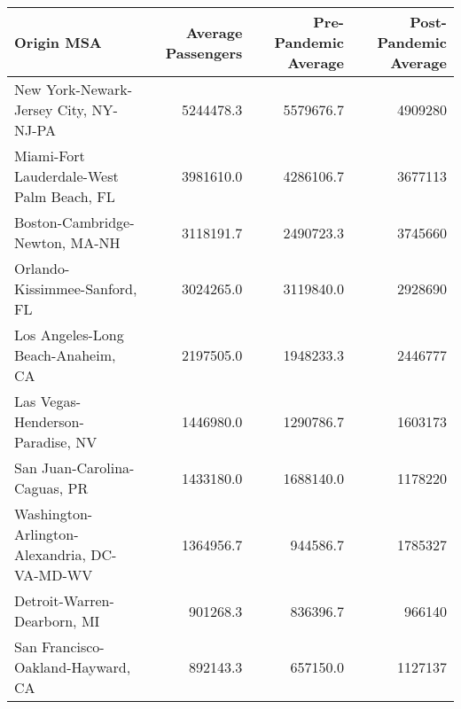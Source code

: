 
\begin{tabular}{lrrr}
\toprule
Origin MSA & Average Passengers & Pre-Pandemic Average & Post-Pandemic Average\\
\midrule
New York-Newark-Jersey City, NY-NJ-PA & 5244478.3 & 5579676.7 & 4909280\\
Miami-Fort Lauderdale-West Palm Beach, FL & 3981610.0 & 4286106.7 & 3677113\\
Boston-Cambridge-Newton, MA-NH & 3118191.7 & 2490723.3 & 3745660\\
Orlando-Kissimmee-Sanford, FL & 3024265.0 & 3119840.0 & 2928690\\
Los Angeles-Long Beach-Anaheim, CA & 2197505.0 & 1948233.3 & 2446777\\
Las Vegas-Henderson-Paradise, NV & 1446980.0 & 1290786.7 & 1603173\\
San Juan-Carolina-Caguas, PR & 1433180.0 & 1688140.0 & 1178220\\
Washington-Arlington-Alexandria, DC-VA-MD-WV & 1364956.7 & 944586.7 & 1785327\\
Detroit-Warren-Dearborn, MI & 901268.3 & 836396.7 & 966140\\
San Francisco-Oakland-Hayward, CA & 892143.3 & 657150.0 & 1127137\\
\bottomrule
\end{tabular}
